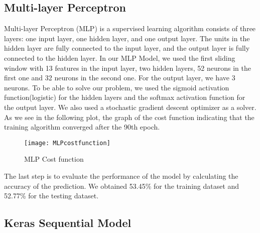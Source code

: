 \subsection{Multi-layer Perceptron}

Multi-layer Perceptron (MLP) is a supervised learning algorithm consists of three layers: one input layer, one hidden layer, and one output layer. The units in the hidden layer are fully connected to the input layer, and the output layer is fully connected to the hidden layer.\newline \newline %
In our MLP Model, we used the first sliding window with 13 features in the input layer, two hidden layers, 52 neurons in the first one and 32 neurons in the second one. For the output layer, we have 3 neurons.\newline \newline  
To be able to solve our problem, we used the sigmoid activation function(logistic) for the hidden layers and the softmax activation function for the output layer. We also used a stochastic gradient descent optimizer as a solver. \newline 
As we see in the following plot, the graph of the cost function indicating that the training algorithm converged after the 90th epoch. \newline

\begin{figure}[h]
\label{fig:MLPcostfunction}
\begin{center}
\texttt{[image: MLPcostfunction]}
\end{center}
\caption{MLP Cost function}
\end{figure}
The last step is to evaluate the performance of the model by calculating the accuracy of the prediction. We obtained 53.45\% for the training dataset and 52.77\% for the testing dataset.

\subsection{Keras Sequential Model}


